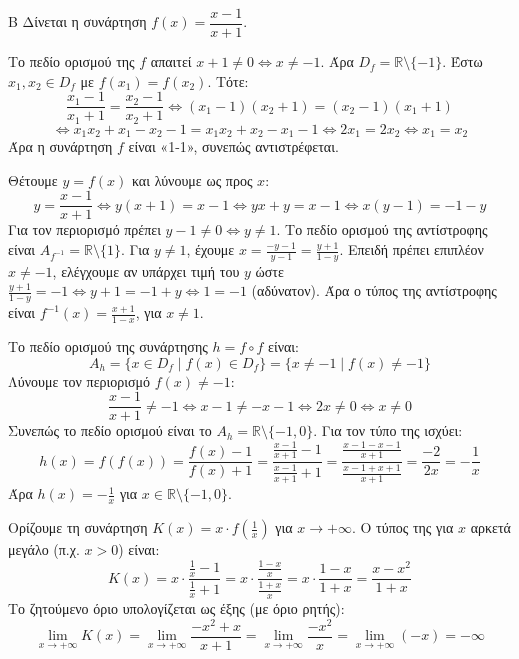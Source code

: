 
\begin{thema}{Β}
Δίνεται η συνάρτηση $f(x) = \dfrac{x-1}{x+1}$.

\begin{erwthma}
\item Το πεδίο ορισμού της $f$ απαιτεί $x+1 \ne 0 \Leftrightarrow x \ne -1$. Άρα $D_f = \mathbb{R} \setminus \{-1\}$.
Έστω $x_1, x_2 \in D_f$ με $f(x_1) = f(x_2)$. Τότε:
\[ \frac{x_1-1}{x_1+1} = \frac{x_2-1}{x_2+1} \Leftrightarrow (x_1-1)(x_2+1) = (x_2-1)(x_1+1) \]
\[ \Leftrightarrow x_1 x_2 + x_1 - x_2 - 1 = x_1 x_2 + x_2 - x_1 - 1 \Leftrightarrow 2x_1 = 2x_2 \Leftrightarrow x_1 = x_2 \]
Άρα η συνάρτηση $f$ είναι «1-1», συνεπώς αντιστρέφεται.

\item Θέτουμε $y = f(x)$ και λύνουμε ως προς $x$:
\[ y = \frac{x-1}{x+1} \Leftrightarrow y(x+1) = x-1 \Leftrightarrow yx + y = x - 1 \Leftrightarrow x(y-1) = -1 - y \]
Για τον περιορισμό πρέπει $y-1 \ne 0 \Leftrightarrow y \ne 1$. Το πεδίο ορισμού της αντίστροφης είναι $A_{f^{-1}} = \mathbb{R} \setminus \{1\}$.
Για $y \ne 1$, έχουμε $x = \frac{-y-1}{y-1} = \frac{y+1}{1-y}$. Επειδή πρέπει επιπλέον $x \ne -1$, ελέγχουμε αν υπάρχει τιμή του $y$ ώστε $\frac{y+1}{1-y} = -1 \Leftrightarrow y+1 = -1+y \Leftrightarrow 1 = -1$ (αδύνατον).
Άρα ο τύπος της αντίστροφης είναι $f^{-1}(x) = \frac{x+1}{1-x}$, για $x \ne 1$.

\item Το πεδίο ορισμού της συνάρτησης $h = f \circ f$ είναι:
\[ A_h = \{x \in D_f \mid f(x) \in D_f\} = \{x \ne -1 \mid f(x) \ne -1\} \]
Λύνουμε τον περιορισμό $f(x) \ne -1$:
\[ \frac{x-1}{x+1} \ne -1 \Leftrightarrow x-1 \ne -x-1 \Leftrightarrow 2x \ne 0 \Leftrightarrow x \ne 0 \]
Συνεπώς το πεδίο ορισμού είναι το $A_h = \mathbb{R} \setminus \{-1, 0\}$.
Για τον τύπο της ισχύει:
\[ h(x) = f(f(x)) = \frac{f(x)-1}{f(x)+1} = \frac{\frac{x-1}{x+1} - 1}{\frac{x-1}{x+1} + 1} = \frac{\frac{x-1-x-1}{x+1}}{\frac{x-1+x+1}{x+1}} = \frac{-2}{2x} = -\frac{1}{x} \]
Άρα $h(x) = -\frac{1}{x}$ για $x \in \mathbb{R} \setminus \{-1, 0\}$.

\item Ορίζουμε τη συνάρτηση $K(x) = x \cdot f\left(\frac{1}{x}\right)$ για $x \to +\infty$.
Ο τύπος της για $x$ αρκετά μεγάλο (π.χ. $x > 0$) είναι:
\[ K(x) = x \cdot \frac{\frac{1}{x}-1}{\frac{1}{x}+1} = x \cdot \frac{\frac{1-x}{x}}{\frac{1+x}{x}} = x \cdot \frac{1-x}{1+x} = \frac{x-x^2}{1+x} \]
Το ζητούμενο όριο υπολογίζεται ως έξης (με όριο ρητής):
\[ \lim_{x\to+\infty} K(x) = \lim_{x\to+\infty} \frac{-x^2+x}{x+1} = \lim_{x\to+\infty} \frac{-x^2}{x} = \lim_{x\to+\infty} (-x) = -\infty \]
\end{erwthma}
\end{thema}

